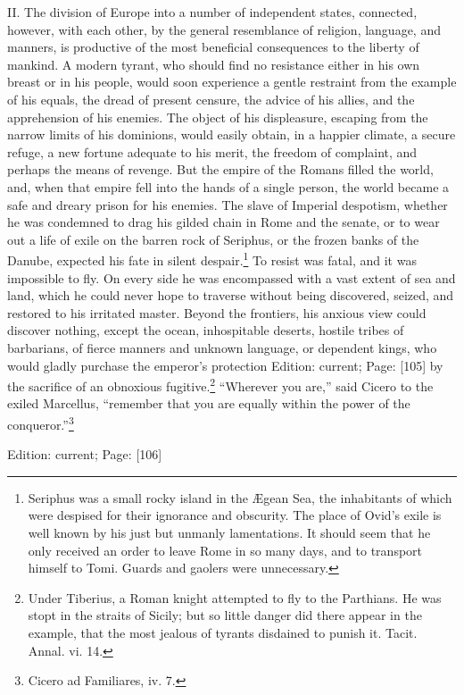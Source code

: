 II. The division of Europe into a number of independent states, connected, however, with each other, by the general resemblance of religion, language, and manners, is productive of the most beneficial consequences to the liberty of mankind. A modern tyrant, who should find no resistance either in his own breast or in his people, would soon experience a gentle restraint from the example of his equals, the dread of present censure, the advice of his allies, and the apprehension of his enemies. The object of his displeasure, escaping from the narrow limits of his dominions, would easily obtain, in a happier climate, a secure refuge, a new fortune adequate to his merit, the freedom of complaint, and perhaps the means of revenge. But the empire of the Romans filled the world, and, when that empire fell into the hands of a single person, the world became a safe and dreary prison for his enemies. The slave of Imperial despotism, whether he was condemned to drag his gilded chain in Rome and the senate, or to wear out a life of exile on the barren rock of Seriphus, or the frozen banks of the Danube, expected his fate in silent despair.\footnote{Seriphus was a small rocky island in the Ægean Sea, the inhabitants of which were despised for their ignorance and obscurity. The place of Ovid\texthebrew{}’s exile is well known by his just but unmanly lamentations. It should seem that he only received an order to leave Rome in so many days, and to transport himself to Tomi. Guards and gaolers were unnecessary.} To resist was fatal, and it was impossible to fly. On every side he was encompassed with a vast extent of sea and land, which he could never hope to traverse without being discovered, seized, and restored to his irritated master. Beyond the frontiers, his anxious view could discover nothing, except the ocean, inhospitable deserts, hostile tribes of barbarians, of fierce manners and unknown language, or dependent kings, who would gladly purchase the emperor\texthebrew{}’s protection Edition: current; Page: [105] by the sacrifice of an obnoxious fugitive.\footnote{Under Tiberius, a Roman knight attempted to fly to the Parthians. He was stopt in the straits of Sicily; but so little danger did there appear in the example, that the most jealous of tyrants disdained to punish it. Tacit. Annal. vi. 14.} \texthebrew{“}Wherever you are,\texthebrew{}” said Cicero to the exiled Marcellus, \texthebrew{“}remember that you are equally within the power of the conqueror.\texthebrew{}”\footnote{Cicero ad Familiares, iv. 7.}

Edition: current; Page: [106]

